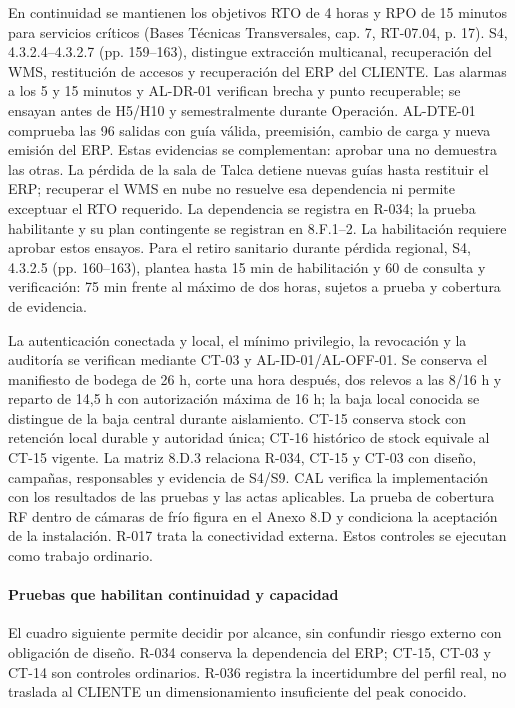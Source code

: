 En continuidad se mantienen los objetivos RTO de 4 horas y RPO de 15 minutos para servicios críticos (Bases Técnicas Transversales, cap. 7, RT-07.04, p. 17). S4, 4.3.2.4--4.3.2.7 (pp. 159--163), distingue extracción multicanal, recuperación del WMS, restitución de accesos y recuperación del ERP del CLIENTE. Las alarmas a los 5 y 15 minutos y AL-DR-01 verifican brecha y punto recuperable; se ensayan antes de H5/H10 y semestralmente durante Operación. AL-DTE-01 comprueba las 96 salidas con guía válida, preemisión, cambio de carga y nueva emisión del ERP. Estas evidencias se complementan: aprobar una no demuestra las otras. La pérdida de la sala de Talca detiene nuevas guías hasta restituir el ERP; recuperar el WMS en nube no resuelve esa dependencia ni permite exceptuar el RTO requerido. La dependencia se registra en R-034; la prueba habilitante y su plan contingente se registran en 8.F.1--2. La habilitación requiere aprobar estos ensayos. Para el retiro sanitario durante pérdida regional, S4, 4.3.2.5 (pp. 160--163), plantea hasta 15 min de habilitación y 60 de consulta y verificación: 75 min frente al máximo de dos horas, sujetos a prueba y cobertura de evidencia.

La autenticación conectada y local, el mínimo privilegio, la revocación y la auditoría se verifican mediante CT-03 y AL-ID-01/AL-OFF-01. Se conserva el manifiesto de bodega de 26 h, corte una hora después, dos relevos a las 8/16 h y reparto de 14,5 h con autorización máxima de 16 h; la baja local conocida se distingue de la baja central durante aislamiento. CT-15 conserva stock con retención local durable y autoridad única; CT-16 histórico de stock equivale al CT-15 vigente. La matriz 8.D.3 relaciona R-034, CT-15 y CT-03 con diseño, campañas, responsables y evidencia de S4/S9. CAL verifica la implementación con los resultados de las pruebas y las actas aplicables. La prueba de cobertura RF dentro de cámaras de frío figura en el Anexo 8.D y condiciona la aceptación de la instalación. R-017 trata la conectividad externa. Estos controles se ejecutan como trabajo ordinario.

\paragraph{Pruebas que habilitan continuidad y capacidad}
El cuadro siguiente permite decidir por alcance, sin confundir riesgo externo
con obligación de diseño. R-034 conserva la dependencia del ERP; CT-15,
CT-03 y CT-14 son controles ordinarios. R-036 registra la incertidumbre del perfil
real, no traslada al CLIENTE un dimensionamiento insuficiente del peak conocido.

